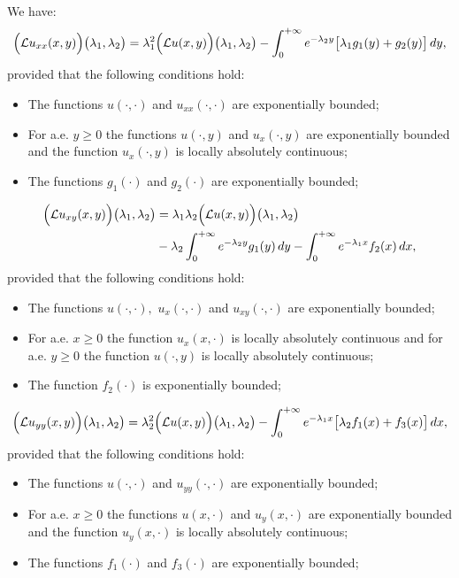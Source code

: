 \documentclass{amsart}
\theoremstyle{definition}
\theoremstyle{remark}
\numberwithin{equation}{section}
\begin{document}
We have:
\begin{align*} 
\Bigl({\mathcal L}u_{xx}(x,y)\Bigr)\bigl( \lambda_{1},\lambda_{2} \bigr)= \lambda_{1}^{2}\Bigl({\mathcal L}u(x,y)\Bigr)\bigl( \lambda_{1},\lambda_{2} \bigr)- \int^{+\infty}_{0}e^{-\lambda_{2}y}\bigl[ \lambda_{1}g_{1}(y)+g_{2}(y)\bigr] \, dy,
\end{align*}
provided that the following conditions hold:
\begin{itemize}
\item[(xx1)] The functions $u(\cdot, \cdot)$ and $u_{xx}(\cdot, \cdot)$ are exponentially bounded; 
\item[(xx2)] For a.e. $y\geq 0$ the functions $u(\cdot,y)$ and $u_{x}(\cdot,y)$ are exponentially bounded and the function $u_{x}(\cdot,y)$ is locally absolutely continuous;
\item[(xx3)] The functions $g_{1}( \cdot)$ and $g_{2}(\cdot)$ are exponentially bounded;
\end{itemize}
\begin{align*} 
\Bigl({\mathcal L}u_{xy}(x,y)\Bigr)\bigl( \lambda_{1},\lambda_{2} \bigr)&= \lambda_{1}\lambda_{2} \Bigl({\mathcal L}u(x,y)\Bigr)\bigl( \lambda_{1},\lambda_{2} \bigr) 
\\& -\lambda_{2}\int^{+\infty}_{0}e^{-\lambda_{2}y}g_{1}(y)\, dy-\int^{+\infty}_{0}e^{-\lambda_{1}x}f_{2}(x)\, dx,
\end{align*}
provided that the following conditions hold:
\begin{itemize}
\item[(xy1)] The functions $u(\cdot, \cdot),$ $u_{x}(\cdot, \cdot)$ and $u_{xy}(\cdot, \cdot)$ are exponentially bounded; 
\item[(xy2)] For a.e. $x\geq 0$ the function $u_{x}(x,\cdot)$ is locally absolutely continuous and for a.e. $y\geq 0$ the function $u(\cdot ,y)$ is locally absolutely continuous;
\item[(xy3)] The function $f_{2}( \cdot)$ is exponentially bounded;
\end{itemize}
\begin{align*} 
\Bigl({\mathcal L}u_{yy}(x,y)\Bigr)\bigl( \lambda_{1},\lambda_{2} \bigr)=\lambda_{2}^{2}\Bigl({\mathcal L}u(x,y)\Bigr)\bigl( \lambda_{1},\lambda_{2} \bigr)- \int^{+\infty}_{0}e^{-\lambda_{1}x}\bigl[ \lambda_{2}f_{1}(x)+f_{3}(x)\bigr] \, dx,
\end{align*}
provided that the following conditions hold:
\begin{itemize}
\item[(yy1)] The functions $u(\cdot, \cdot)$ and $u_{yy}(\cdot, \cdot)$ are exponentially bounded; 
\item[(yy2)] For a.e. $x\geq 0$ the functions $u(x,\cdot)$ and $u_{y}(x,\cdot)$ are exponentially bounded and the function $u_{y}(x,\cdot)$ is locally absolutely continuous;
\item[(yy3)] The functions $f_{1}( \cdot)$ and $f_{3}(\cdot)$ are exponentially bounded;
\end{itemize}
\end{document}
